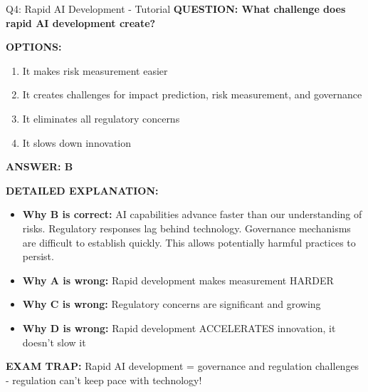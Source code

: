 \documentclass[8pt]{beamer}
\begin{document}
	\begin{frame}{Q4: Rapid AI Development - Tutorial}
		\fontsize{6.5}{7.5}\selectfont
		\textbf{QUESTION: What challenge does rapid AI development create?}
		
		\vspace{0.1cm}
		\textbf{OPTIONS:}
		\begin{enumerate}
			\item It makes risk measurement easier
			\item It creates challenges for impact prediction, risk measurement, and governance
			\item It eliminates all regulatory concerns
			\item It slows down innovation
		\end{enumerate}
		
		\vspace{0.1cm}
		\textcolor{myblue}{\textbf{ANSWER: B}}
		
		\vspace{0.1cm}
		\textbf{DETAILED EXPLANATION:}
		\begin{itemize}
			\item \textbf{Why B is correct:} AI capabilities advance faster than our understanding of risks. Regulatory responses lag behind technology. Governance mechanisms are difficult to establish quickly. This allows potentially harmful practices to persist.
			\item \textbf{Why A is wrong:} Rapid development makes measurement HARDER
			\item \textbf{Why C is wrong:} Regulatory concerns are significant and growing
			\item \textbf{Why D is wrong:} Rapid development ACCELERATES innovation, it doesn't slow it
		\end{itemize}
		
		\textcolor{myred}{\textbf{EXAM TRAP:}} Rapid AI development = \textcolor{myblue}{governance and regulation challenges} - regulation can't keep pace with technology!
	\end{frame}
	
\end{document}
